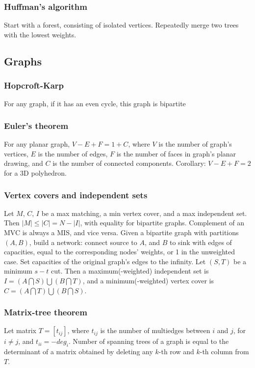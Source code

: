\documentclass[a4paper,12pt]{article}
\newcommand\includefile[4]{
  \subsubsection{#2}
  \begin{multicols}{2}
    
  \end{multicols}
}
\begin{document}
\subsubsection{Huffman's algorithm}
Start with a forest, consisting of isolated vertices. Repeatedly merge two trees with the lowest weights.


\newpage

\subsection{Graphs}
\includefile{c++}{Hopcroft-Karp}{graph}{bip_match.cpp}
For any graph, if it has an even cycle, this graph is bipartite

\newpage
\subsubsection{Euler’s theorem}
For any planar graph, $V - E + F = 1 + C$, where $V$ is the number of graph’s vertices, $E$ is the number of edges, $F$ is the number of faces in graph’s planar drawing,
and $C$ is the number of connected components. Corollary: $V - E + F = 2$ for a 3D polyhedron.

\subsubsection{Vertex covers and independent sets}
Let $M$, $C$, $I$ be a max matching, a min vertex cover, and a max independent set. Then $|M| \leq |C| = N - |I|$, with equality for bipartite graphs. Complement of an MVC is always a MIS, and vice versa.
Given a bipartite graph with partitions $(A,B)$, build a network: connect source to $A$, and $B$ to sink with edges of capacities, equal to the corresponding nodes’ weights, or 1 in the unweighted case.
Set capacities of the original graph’s edges to the infinity. Let $(S,T)$ be a minimum $s-t$ cut. 
Then a maximum(-weighted) independent set is $I = (A \bigcap S) \bigcup (B \bigcap T)$, and a minimum(-weighted) vertex cover is $C = (A \bigcap T) \bigcup (B \bigcap S)$.

\subsubsection{Matrix-tree theorem}
Let matrix $T = [t_{ij}]$, where $t_{ij}$ is the number of multiedges between $i$ and $j$, for $i \neq j$, and $t_{ii} = -deg_i$.
Number of spanning trees of a graph is equal to the determinant of a matrix obtained by deleting any $k$-th row and $k$-th column from $T$.
\end{document}
